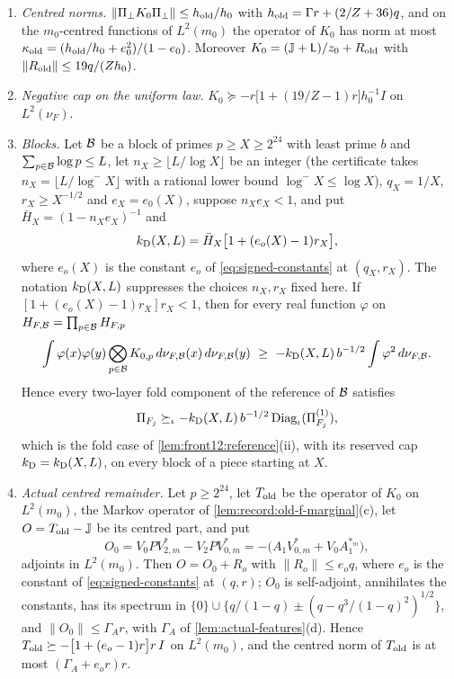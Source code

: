 \begin{lemma}
\begin{enumerate}[label=(\alph*)]
\begin{enumerate}[label=(\roman*)]
  most $q(17-120q+247q^2)/Z\le17q$, and
  $\|\mathsf C_{\rm rem}\|\le17q\le17q/Z\le36q$.
 \end{enumerate}
\item \emph{Centred norms.} $\|\Pi_\perp K_0\Pi_\perp\|\le h_{\rm old}/h_0$ with
 $h_{\rm old}=\Gamma r+(2/Z+36)q$, and on the $m_0$-centred functions of
 $L^2(m_0)$ the operator of $K_0$ has norm at most
 $\kappa_{\rm old}=(h_{\rm old}/h_0+e_0^2)/(1-e_0)$. Moreover
 $K_0=(\mathbb J+\mathsf L)/z_0+R_{\rm old}$ with $\|R_{\rm old}\|\le19q/(Zh_0)$.
\item \emph{Negative cap on the uniform law.}
 $K_0\succeq-r\bigl[1+(19/Z-1)r\bigr]h_0^{-1}I$ on $L^2(\nu_F)$.
\item \emph{Blocks.} Let $\mathcal B$ be a block of primes $p\ge X\ge2^{24}$ with
 least prime $b$ and $\sum_{p\in\mathcal B}\log p\le L$, let $n_X\ge\lfloor L/\log
 X\rfloor$ be an integer (the certificate takes $n_X=\lfloor L/\log^-X\rfloor$
 with a rational lower bound $\log^-X\le\log X$), $q_X=1/X$,
 $r_X\ge X^{-1/2}$ and $e_X=e_0(X)$, suppose $n_Xe_X<1$, and put
 $\bar H_X=(1-n_Xe_X)^{-1}$ and
 \[
  k_{\rm D}(X,L)=\bar H_X\bigl[1+(e_o(X)-1)r_X\bigr],
 \]
 where $e_o(X)$ is the constant $e_o$ of \eqref{eq:signed-constants} at $(q_X,r_X)$. The notation $k_{\rm D}(X,L)$ suppresses the choices $n_X,r_X$ fixed here. If $[1+(e_o(X)-1)r_X]r_X<1$, then for every real function
 $\varphi$ on $H_{F,\mathcal B}=\prod_{p\in\mathcal B}H_{F,p}$
 \[
  \int\varphi(x)\varphi(y)\bigotimes_{p\in\mathcal B}K_{0,p}\,
  d\nu_{F,\mathcal B}(x)\,d\nu_{F,\mathcal B}(y)\ \ge\ -k_{\rm D}(X,L)\,b^{-1/2}
  \int\varphi^2\,d\nu_{F,\mathcal B} .
 \]
 Hence every two-layer fold component of the reference of $\mathcal B$ satisfies
 \[
  \Pi_{F_j}\succeq_\iota-k_{\rm D}(X,L)\,b^{-1/2}\operatorname{Diag}_\iota(\Pi^{(1)}_{F_j}),
 \]
 which is the fold case of \cref{lem:front12:reference}(ii), with its reserved
 cap $k_{\rm D}=k_{\rm D}(X,L)$, on every block of a piece starting at $X$.
\item \emph{Actual centred remainder.} Let $p\ge2^{24}$, let $T_{\rm old}$ be the
 operator of $K_0$ on $L^2(m_0)$, the Markov operator of
 \cref{lem:record:old-f-marginal}(c), let $O=T_{\rm old}-\mathbb J$ be its
 centred part, and put
 \[
  O_0=V_0PV^*_{2,m}-V_2PV^*_{0,m}=-\bigl(A_1V^*_{0,m}+V_0A_1^{*_m}\bigr),
 \]
 adjoints in $L^2(m_0)$. Then $O=O_0+R_o$ with $\|R_o\|\le e_oq$, where $e_o$
 is the constant of \eqref{eq:signed-constants} at $(q,r)$; $O_0$ is
 self-adjoint, annihilates the constants, has its spectrum in
 $\{0\}\cup\{q/(1-q)\pm(q-q^3/(1-q)^2)^{1/2}\}$, and $\|O_0\|\le\Gamma_Ar$, with
 $\Gamma_A$ of \cref{lem:actual-features}(d). Hence
 $T_{\rm old}\succeq-\bigl[1+(e_o-1)r\bigr]r\,I$ on $L^2(m_0)$, and the centred
 norm of $T_{\rm old}$ is at most $(\Gamma_A+e_or)r$.
\end{enumerate}
\end{lemma}

